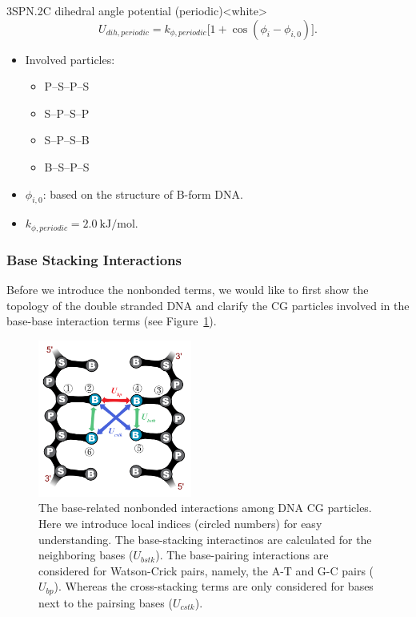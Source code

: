 \begin{smallpage}{3SPN.2C dihedral angle potential (periodic)}<white>
  \begin{equation}
    \label{eq:dna_3spn2c_local_dihedral_periodic}
    U_{dih, periodic} = k_{\phi, periodic} \big[ 1+\cos(\phi_i - \phi_{ i,0 }) \big].
  \end{equation}
  \tcblower
  \begin{itemize}
  \item Involved particles:
    \begin{itemize}
    \item P--S--P--S
    \item S--P--S--P
    \item S--P--S--B
    \item B--S--P--S
    \end{itemize}
  \item $\phi_{i, 0}$: based on the structure of B-form DNA.
  \item $k_{\phi, periodic} = 2.0\ \mathrm{kJ/mol}$.
  \end{itemize}
\end{smallpage}


\subsubsection{Base Stacking Interactions}
\label{sec:dna_3spn2c_potential_bstk}

Before we introduce the nonbonded terms, we would like to first show the
topology of the double stranded DNA and clarify the CG particles involved in the
base-base interaction terms (see Figure~\ref{fig:DNA_3spn2c_nonbonded_all}).

\begin{figure}[ht]
  \centering
  \includegraphics[width=0.45\textwidth]{figures/DNA_3spn2c_nonbonded_all.png}
  \caption{The base-related nonbonded interactions among DNA CG particles.  Here
    we introduce local indices (circled numbers) for easy understanding.  The
    base-stacking interactinos are calculated for the neighboring bases
    ($U_{bstk}$).  The base-pairing interactions are considered for Watson-Crick
    pairs, namely, the A-T and G-C pairs ($U_{bp}$).  Whereas the cross-stacking
    terms are only considered for bases next to the pairsing bases ($U_{cstk}$).}
  \label{fig:DNA_3spn2c_nonbonded_all}
\end{figure}

